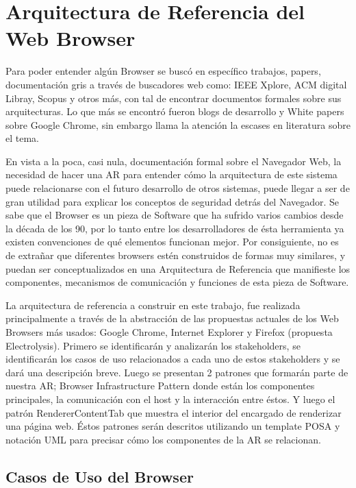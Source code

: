 \chapter{Arquitectura de Referencia del Web Browser}
\label{chap2:ArqRefWB}


Para poder entender algún Browser se buscó en específico trabajos, papers, documentación gris a través de buscadores web como: IEEE Xplore, ACM digital Libray, Scopus y otros más, con tal de encontrar documentos formales sobre sus arquitecturas. Lo que más se encontró fueron blogs de desarrollo y White papers sobre Google Chrome, sin embargo llama la atención la escases en literatura sobre el tema. 


En vista a la poca, casi nula, documentación formal sobre el Navegador Web, la necesidad de hacer una AR para entender cómo la arquitectura de este sistema puede relacionarse con el futuro desarrollo de otros sistemas, puede llegar a ser de gran utilidad para explicar los conceptos de seguridad detrás del Navegador. Se sabe que el Browser es un pieza de Software que ha sufrido varios cambios desde la década de los 90, por lo tanto entre los desarrolladores de ésta herramienta ya existen convenciones de qué elementos funcionan mejor. Por consiguiente, no es de extrañar que diferentes browsers estén construidos de formas muy similares, y puedan ser conceptualizados en una Arquitectura de Referencia que manifieste los componentes, mecanismos de comunicación y funciones de esta pieza de Software. 


La arquitectura de referencia a construir en este trabajo, fue realizada principalmente a través de la abstracción de las propuestas actuales de los Web Browsers más usados: Google Chrome, Internet Explorer y Firefox (propuesta Electrolysis). Primero se identificarán y analizarán los stakeholders, se identificarán los casos de uso relacionados a cada uno de estos stakeholders y se dará una descripción breve. Luego se presentan 2 patrones que formarán parte de nuestra AR; Browser Infrastructure Pattern donde están los componentes principales, la comunicación con el host y la interacción entre éstos. Y luego el patrón RendererContentTab que muestra el interior del encargado de renderizar una página web. Éstos patrones serán descritos utilizando un template POSA \cite{buschman1996system} y notación UML para precisar cómo los componentes de la AR se relacionan. 

\section{Casos de Uso del Browser}
